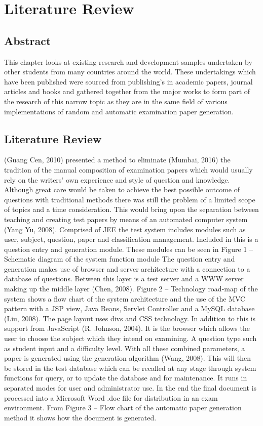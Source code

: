 \chapter{Literature Review}


\section{Abstract}

This chapter looks at existing research and development samples undertaken by other students from many countries around the world. These undertakings which have been published were sourced from publishing’s in academic papers, journal articles and books and gathered together from the major works to form part of the research of this narrow topic as they are in the same field of various implementations of random and automatic examination paper generation.


\section{Literature Review}

(Guang Cen, 2010) presented a method to eliminate (Mumbai, 2016) the tradition of the manual composition of examination papers which would usually rely on the writers’ own experience and style of question and knowledge. Although great care would be taken to achieve the best possible outcome of questions with traditional methods there was still the problem of a limited scope of topics and a time consideration. This would bring upon the separation between teaching and creating test papers by means of an automated computer system (Yang Yu, 2008). Comprised of JEE the test system includes modules such as user, subject, question, paper and classification management. Included in this is a question entry and generation module. These modules can be seen in Figure 1 – Schematic diagram of the system function module The question entry and generation makes use of browser and server architecture with a connection to a database of questions. Between this layer is a test server and a WWW server making up the middle layer (Chen, 2008). Figure 2 – Technology road-map of the system shows a flow chart of the system architecture and the use of the MVC pattern with a JSP view, Java Beans, Servlet Controller and a MySQL database (Liu, 2008). The page layout uses divs and CSS technology. In addition to this is support from JavaScript (R. Johnson, 2004). It is the browser which allows the user to choose the subject which they intend on examining. A question type such as student input and a difficulty level. With all these combined parameters, a paper is generated using the generation algorithm (Wang, 2008). This will then be stored in the test database which can be recalled at any stage through system functions for query, or to update the database and for maintenance. It runs in separated modes for user and administrator use. In the end the final document is processed into a Microsoft Word .doc file for distribution in an exam environment. From Figure 3 – Flow chart of the automatic paper generation method it shows how the document is generated.

